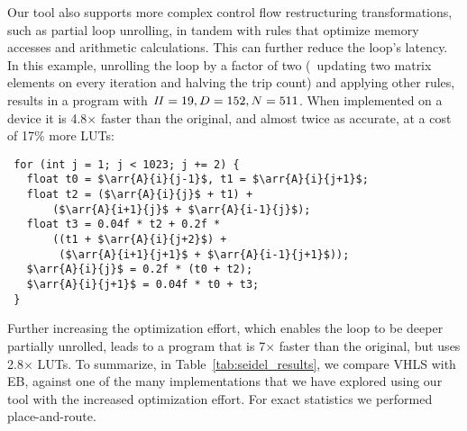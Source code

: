 Our tool also supports more complex control flow restructuring transformations,
such as partial loop unrolling, in tandem with rules that optimize memory
accesses and arithmetic calculations.  This can further reduce the loop's
latency.  In this example, unrolling the loop by a factor of two (\ie~updating
two matrix elements on every iteration and halving the trip count) and applying
other rules, results in a program with $\mathit{II} = 19, D = 152, N = 511$.  When
implemented on a device it is 4.8$\times$ faster than the original, and almost
twice as accurate, at a cost of 17\% more LUTs:
%
\begin{lstlisting}
 for (int j = 1; j < 1023; j += 2) {
   float t0 = $\arr{A}{i}{j-1}$, t1 = $\arr{A}{i}{j+1}$;
   float t2 = ($\arr{A}{i}{j}$ + t1) +
       ($\arr{A}{i+1}{j}$ + $\arr{A}{i-1}{j}$);
   float t3 = 0.04f * t2 + 0.2f *
       ((t1 + $\arr{A}{i}{j+2}$) +
        ($\arr{A}{i+1}{j+1}$ + $\arr{A}{i-1}{j+1}$));
   $\arr{A}{i}{j}$ = 0.2f * (t0 + t2);
   $\arr{A}{i}{j+1}$ = 0.04f * t0 + t3;
 }
\end{lstlisting}
%
Further increasing the optimization effort, which enables the loop to
be deeper partially unrolled, leads to a program that is 7$\times$
faster than the original, but uses 2.8$\times$ LUTs.  To summarize, in
Table~\ref{tab:seidel_results}, we compare VHLS with EB, against one of the
many implementations that we have explored using our tool with the increased
optimization effort.  For exact statistics we performed place-and-route.
%

